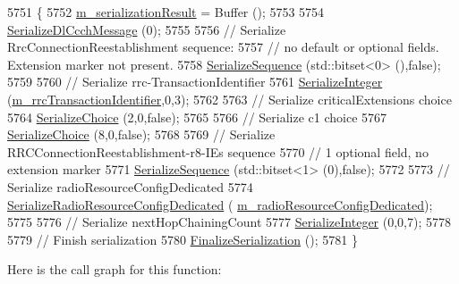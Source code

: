 \begin{DoxyCode}
5751 \{
5752   \hyperlink{classns3_1_1Asn1Header_a758b74023ea5bf40941af6f0a6a66058}{m\_serializationResult} = Buffer ();
5753 
5754   \hyperlink{classns3_1_1RrcDlCcchMessage_ad9df8191a3ee4f9e7f0343f5b515565f}{SerializeDlCcchMessage} (0);
5755 
5756   \textcolor{comment}{// Serialize RrcConnectionReestablishment sequence:}
5757   \textcolor{comment}{// no default or optional fields. Extension marker not present.}
5758   \hyperlink{classns3_1_1Asn1Header_aa9744858380443ed95836fed08799aed}{SerializeSequence} (std::bitset<0> (),\textcolor{keyword}{false});
5759 
5760   \textcolor{comment}{// Serialize rrc-TransactionIdentifier}
5761   \hyperlink{classns3_1_1Asn1Header_ab1c3bd37730affa7473bc759d625c29a}{SerializeInteger} (\hyperlink{classns3_1_1RrcConnectionReestablishmentHeader_a0076e23c53a65fe3c18a95c6d4d007c7}{m\_rrcTransactionIdentifier},0,3);
5762 
5763   \textcolor{comment}{// Serialize criticalExtensions choice}
5764   \hyperlink{classns3_1_1Asn1Header_a400ef4a710499da80fc55e23a973d4fa}{SerializeChoice} (2,0,\textcolor{keyword}{false});
5765 
5766   \textcolor{comment}{// Serialize c1 choice}
5767   \hyperlink{classns3_1_1Asn1Header_a400ef4a710499da80fc55e23a973d4fa}{SerializeChoice} (8,0,\textcolor{keyword}{false});
5768 
5769   \textcolor{comment}{// Serialize RRCConnectionReestablishment-r8-IEs sequence}
5770   \textcolor{comment}{// 1 optional field, no extension marker}
5771   \hyperlink{classns3_1_1Asn1Header_aa9744858380443ed95836fed08799aed}{SerializeSequence} (std::bitset<1> (0),\textcolor{keyword}{false});
5772 
5773   \textcolor{comment}{// Serialize radioResourceConfigDedicated}
5774   \hyperlink{classns3_1_1RrcAsn1Header_a21940b59764c933864f631482a6e4af0}{SerializeRadioResourceConfigDedicated} (
      \hyperlink{classns3_1_1RrcConnectionReestablishmentHeader_a0e59f072a5c743c2f72869a0ae941130}{m\_radioResourceConfigDedicated});
5775 
5776   \textcolor{comment}{// Serialize nextHopChainingCount}
5777   \hyperlink{classns3_1_1Asn1Header_ab1c3bd37730affa7473bc759d625c29a}{SerializeInteger} (0,0,7);
5778 
5779   \textcolor{comment}{// Finish serialization}
5780   \hyperlink{classns3_1_1Asn1Header_a6c9bfaa54e5ca1a4eb8ea6c6b5550a8b}{FinalizeSerialization} ();
5781 \}
\end{DoxyCode}


Here is the call graph for this function\+:


